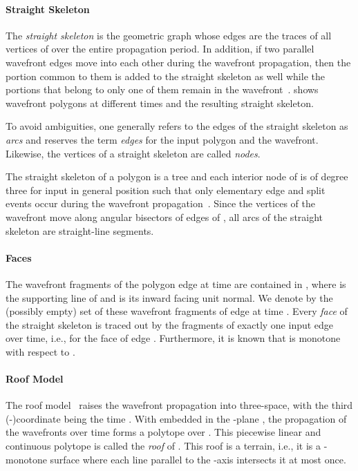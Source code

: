 \documentclass[preprint]{elsarticle}
\begin{document}
\paragraph{Straight Skeleton}

The \emph{straight skeleton}  is the geometric graph whose
edges are the traces of all vertices of  over the entire propagation
period.
In addition, if two parallel wavefront edges move into each other during the
wavefront propagation, then the portion common to them is added to the straight
skeleton as well while the portions that belong to only one of them remain in
the wavefront~\cite{Bie&15a}.
 shows wavefront polygons at different times and the resulting
straight skeleton.

To avoid ambiguities, one generally refers to the edges of the straight
skeleton as \emph{arcs} and reserves the term \emph{edges} for the input
polygon and the wavefront.  Likewise, the vertices of a straight skeleton
are called \emph{nodes}.

The straight skeleton of a polygon is a tree and
each interior node of  is of degree three for input in general
position such that only elementary edge and split events occur during the
wavefront propagation~\cite{Aic&95}.
Since the vertices of the wavefront move along angular bisectors of edges of
, all arcs of the straight skeleton are straight-line segments.

\paragraph{Faces}

The wavefront fragments of the polygon edge  at time  are
contained in , where  is the
supporting line of  and  is its inward facing unit normal.  We
denote by  the (possibly empty) set of these wavefront fragments
of edge  at time .  Every \emph{face} of the straight skeleton is
traced out by the fragments of exactly one input edge over time, i.e.,
 for the face  of edge . Furthermore,
it is known that  is monotone  with respect to  \cite{Aic&95}.

\paragraph{Roof Model}

The roof model~\cite{Aic&95} raises the wavefront propagation into
three-space, with the third (-)coordinate being the time .  With 
embedded in the -plane , the propagation of the wavefronts over time
forms a polytope over .  This piecewise linear and continuous polytope
 is called the \emph{roof}
of .  This roof is a terrain, i.e., it is a -monotone surface where each
line parallel to the -axis intersects it at most once.
\end{document}
